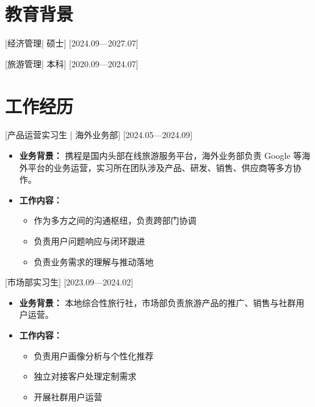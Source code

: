 \documentclass{resume}
\begin{document}

\ResumeTitle

\section{教育背景}

[\textnormal{经济管理|} 硕士]
[2024.09—2027.07]

[\textnormal{旅游管理|} 本科]
[2020.09—2024.07]

\section{工作经历}

[\textnormal{产品运营实习生 |} 海外业务部]
[2024.05—2024.09]

\begin{itemize}

\item \textbf{业务背景：} 携程是国内头部在线旅游服务平台，海外业务部负责 Google 等海外平台的业务运营，实习所在团队涉及产品、研发、销售、供应商等多方协作。

\item \textbf{工作内容：}
\begin{itemize}
  \item 作为多方之间的沟通枢纽，负责跨部门协调
  \item 负责用户问题响应与闭环跟进
  \item 负责业务需求的理解与推动落地
\end{itemize}

\end{itemize}

[\textnormal{市场部实习生}]
[2023.09—2024.02]

\begin{itemize}

\item \textbf{业务背景：} 本地综合性旅行社，市场部负责旅游产品的推广、销售与社群用户运营。

\item \textbf{工作内容：}
\begin{itemize}
  \item 负责用户画像分析与个性化推荐
  \item 独立对接客户处理定制需求
  \item 开展社群用户运营
\end{itemize}

\end{itemize}
\end{document}
